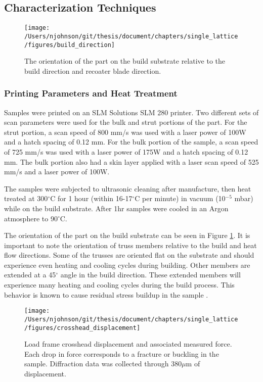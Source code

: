 \subsection{Characterization Techniques}

\begin{figure}[b]
	\texttt{[image: /Users/njohnson/git/thesis/document/chapters/single\_lattice/figures/build\_direction]}
	\caption{The orientation of the part on the build substrate relative to the build direction and recoater blade direction.}
	\label{build_direction}
\end{figure}

\subsubsection{Printing Parameters and Heat Treatment}
Samples were printed on an SLM Solutions SLM 280 printer. Two different sets of scan parameters were used for the bulk and strut portions of the part. For the strut portion, a scan speed of 800 mm/s was used with a laser power of 100W and a hatch spacing of 0.12 mm. For the bulk portion of the sample, a scan speed of 725 mm/s was used with a laser power of 175W and a hatch spacing of 0.12 mm. The bulk portion also had a skin layer applied with a laser scan speed of 525 mm/s and a laser power of 100W. 

The samples were subjected to ultrasonic cleaning after manufacture, then heat treated at 300$^\circ$C for 1 hour (within 16-17$^\circ$C per minute) in vacuum (10$^{-5}$ mbar) while on the build substrate. After 1hr samples were cooled in an Argon atmosphere to 90$^\circ$C.

The orientation of the part on the build substrate can be seen in Figure \ref{build_direction}. It is important to note the orientation of truss members relative to the build and heat flow directions. Some of the trusses are oriented flat on the substrate and should experience even heating and cooling cycles during building. Other members are extended at a 45$^\circ$ angle in the build direction. These extended members will experience many heating and cooling cycles during the build process. This behavior is known to cause residual stress buildup in the sample \cite{Ganeriwala2019}.

\begin{figure}[b]
	\texttt{[image: /Users/njohnson/git/thesis/document/chapters/single\_lattice/figures/crosshead\_displacement]}
	\caption{Load frame crosshead displacement and associated measured force. Each drop in force corresponds to a fracture or buckling in the sample. Diffraction data was collected through 380$\mu$m of displacement.}
	\label{loaddisp}
\end{figure}


